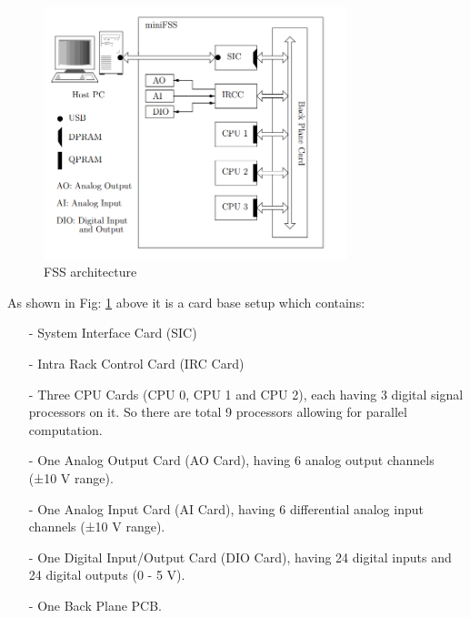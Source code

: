 \begin{figure}[th]
\centering
\includegraphics[width=250pt]{fig/fss_arch2.png}
\caption{FSS architecture}
\label{fig:fss_arch}
\end{figure}
As shown in Fig: \ref{fig:fss_arch} above it is a card base setup which contains:



\begin{itemize}
\item[-] System Interface Card (SIC)
\item[-] Intra Rack Control Card (IRC Card)
\item[-] Three CPU Cards (CPU 0, CPU 1 and CPU 2), each having 3 digital signal processors on it. So there are total 9 processors allowing for parallel computation.
\item[-] One Analog Output Card (AO Card), having 6 analog output channels (±10 V range).
\item[-]One Analog Input Card (AI Card), having 6 differential analog input channels (±10 V range).
\item[-] One Digital Input/Output Card (DIO Card), having 24 digital inputs and 24 digital outputs (0 - 5 V).
\item[-] One Back Plane PCB.
\end{itemize}

